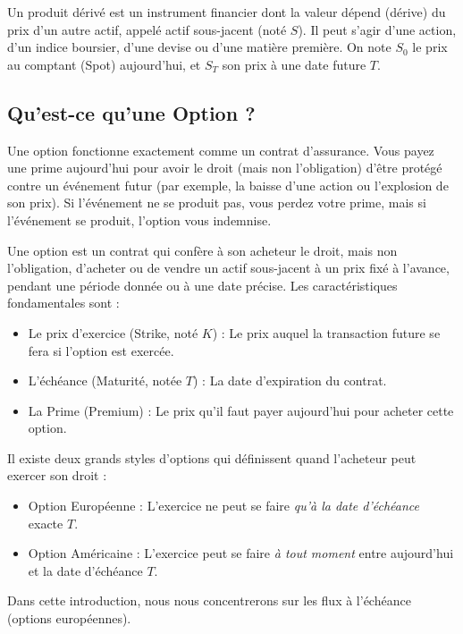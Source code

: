 \begin{definitionbox}
Un produit dérivé est un instrument financier dont la valeur dépend (dérive) du prix d'un autre actif, appelé actif sous-jacent (noté $S$). Il peut s'agir d'une action, d'un indice boursier, d'une devise ou d'une matière première. 
On note $S_0$ le prix au comptant (Spot) aujourd'hui, et $S_T$ son prix à une date future $T$.
\end{definitionbox}

\subsection{Qu'est-ce qu'une Option ?}

Une option fonctionne exactement comme un contrat d'assurance. Vous payez une prime aujourd'hui pour avoir le droit (mais non l'obligation) d'être protégé contre un événement futur (par exemple, la baisse d'une action ou l'explosion de son prix). Si l'événement ne se produit pas, vous perdez votre prime, mais si l'événement se produit, l'option vous indemnise.

\begin{definitionbox}
Une option est un contrat qui confère à son acheteur le droit, mais non l'obligation, d'acheter ou de vendre un actif sous-jacent à un prix fixé à l'avance, pendant une période donnée ou à une date précise.
Les caractéristiques fondamentales sont :
\begin{itemize}[label=$\rightarrow$]
    \item Le prix d'exercice (Strike, noté $K$) : Le prix auquel la transaction future se fera si l'option est exercée.
    \item L'échéance (Maturité, notée $T$) : La date d'expiration du contrat.
    \item La Prime (Premium) : Le prix qu'il faut payer aujourd'hui pour acheter cette option.
\end{itemize}
\end{definitionbox}

\begin{remarquebox}
Il existe deux grands styles d'options qui définissent quand l'acheteur peut exercer son droit :
\begin{itemize}[label=$\cdot$]
    \item Option Européenne : L'exercice ne peut se faire \textit{qu'à la date d'échéance} exacte $T$.
    \item Option Américaine : L'exercice peut se faire \textit{à tout moment} entre aujourd'hui et la date d'échéance $T$.
\end{itemize}
Dans cette introduction, nous nous concentrerons sur les flux à l'échéance (options européennes).
\end{remarquebox}

